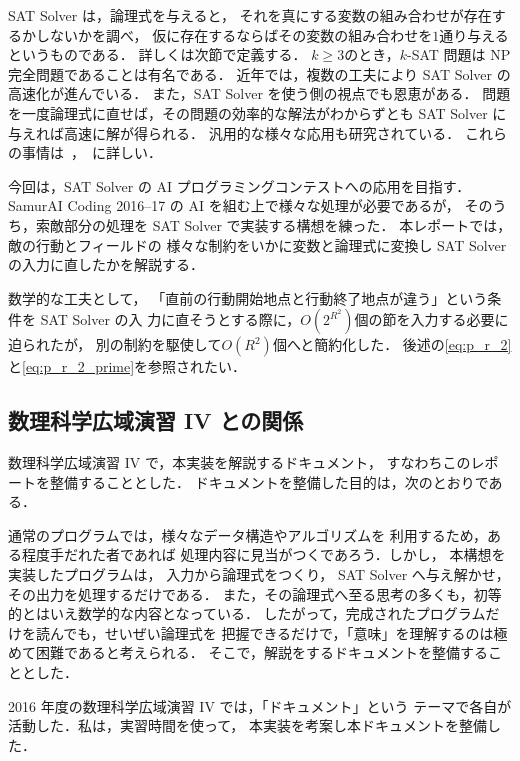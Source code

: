 SAT Solver は，論理式を与えると，
それを真にする変数の組み合わせが存在するかしないかを調べ，
仮に存在するならばその変数の組み合わせを$1$通り与えるというものである．
詳しくは次節で定義する．
$k \geq 3$のとき，$k$-SAT 問題は NP 完全問題であることは有名である．
近年では，複数の工夫により SAT Solver の高速化が進んでいる．
また，SAT Solver を使う側の視点でも恩恵がある．
問題を一度論理式に直せば，その問題の効率的な解法がわからずとも
SAT Solver に与えれば高速に解が得られる．
汎用的な様々な応用も研究されている．
これらの事情は~\cite{weko_169441_1}，~\cite{Knuth201512}に詳しい．

今回は，SAT Solver の AI プログラミングコンテストへの応用を目指す．
SamurAI Coding 2016--17 の AI を組む上で様々な処理が必要であるが，
そのうち，索敵部分の処理を SAT Solver で実装する構想を練った．
本レポートでは，敵の行動とフィールドの
様々な制約をいかに変数と論理式に変換し SAT Solver
の入力に直したかを解説する．

数学的な工夫として，
「直前の行動開始地点と行動終了地点が違う」という条件を SAT Solver の入
力に直そうとする際に，$O\left(2^{R^2}\right)$個の節を入力する必要に迫られたが，
別の制約を駆使して$O(R^2)$個へと簡約化した．
後述の\eqref{eq:p_r_2}と\eqref{eq:p_r_2_prime}を参照されたい．

\subsection{数理科学広域演習 IV との関係}

数理科学広域演習 IV で，本実装を解説するドキュメント，
すなわちこのレポートを整備することとした．
ドキュメントを整備した目的は，次のとおりである．

通常のプログラムでは，様々なデータ構造やアルゴリズムを
利用するため，ある程度手だれた者であれば
処理内容に見当がつくであろう．しかし，
本構想を実装したプログラムは，
入力から論理式をつくり， SAT Solver へ与え解かせ，その出力を処理するだけである．
また，その論理式へ至る思考の多くも，初等的とはいえ数学的な内容となっている．
したがって，完成されたプログラムだけを読んでも，せいぜい論理式を
把握できるだけで，「意味」を理解するのは極めて困難であると考えられる．
そこで，解説をするドキュメントを整備することとした．

2016 年度の数理科学広域演習 IV では，「ドキュメント」という
テーマで各自が活動した．私は，実習時間を使って，
本実装を考案し本ドキュメントを整備した．

